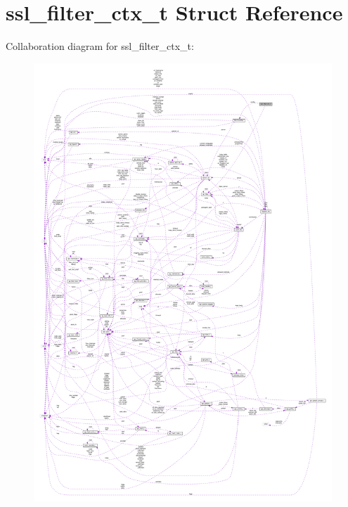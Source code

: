 \hypertarget{structssl__filter__ctx__t}{}\section{ssl\+\_\+filter\+\_\+ctx\+\_\+t Struct Reference}
\label{structssl__filter__ctx__t}


Collaboration diagram for ssl\+\_\+filter\+\_\+ctx\+\_\+t\+:
\nopagebreak
\begin{figure}[H]
\begin{center}
\leavevmode
\includegraphics[width=350pt]{structssl__filter__ctx__t__coll__graph}
\end{center}
\end{figure}

